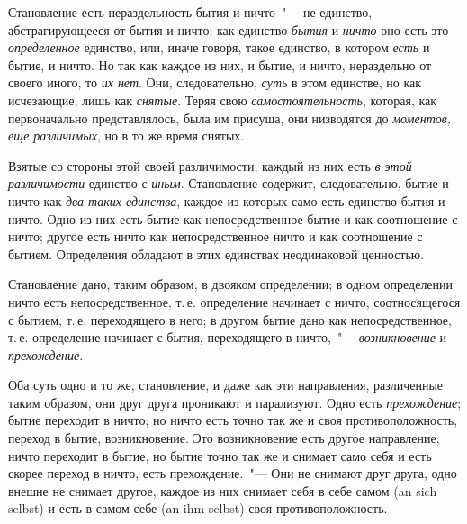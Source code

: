 Становление есть нераздельность бытия и ничто~"--- не
единство, абстрагирующееся от бытия и ничто; как единство
\emph{бытия} и \emph{ничто} оно есть это \emph{определенное} единство,
или, иначе говоря, такое единство, в котором \emph{есть} и бытие,
и ничто. Но так как каждое из них, и бытие, и ничто,
нераздельно от своего иного, то \emph{их нет}. Они, следовательно,
\emph{суть} в этом единстве, но как исчезающие, лишь
как \emph{снятые}. Теряя свою \emph{самостоятельность}, которая, как
первоначально представлялось, была им присуща, они
низводятся до \emph{моментов, еще различимых}, но в то же
время снятых.

Взятые со стороны этой своей различимости, каждый
из них есть \emph{в этой различимости} единство с \emph{иным}. Становление
содержит, следовательно, бытие и ничто как \emph{два
таких единства}, каждое из которых само есть единство
бытия и ничто. Одно из них есть бытие как непосредственное
бытие и как соотношение с ничто; другое есть ничто
как непосредственное ничто и как соотношение с бытием.
Определения обладают в этих единствах неодинаковой
ценностью.

Становление дано, таким образом, в двояком определении;
в одном определении ничто есть непосредственное,
т.\,е. определение начинает с ничто, соотносящегося
с бытием, т.\,е. переходящего в него; в другом бытие дано
как непосредственное, т.\,е. определение начинает с бытия,
переходящего в ничто,~"--- \emph{возникновение} и \emph{прехождение}.

Оба суть одно и то же, становление, и даже как эти
направления, различенные таким образом, они друг друга
проникают и парализуют. Одно есть \emph{прехождение}; бытие
переходит в ничто; но ничто есть точно так же и своя
противоположность, переход в бытие, возникновение. Это
возникновение есть другое направление; ничто переходит
в бытие, но бытие точно так же и снимает само себя и
есть скорее переход в ничто, есть прехождение.~"--- Они не
снимают друг друга, одно внешне не снимает другое,
каждое из них снимает себя в себе самом (an sich selbst)
и есть в самом себе (an ihm selbst) своя противоположность.



